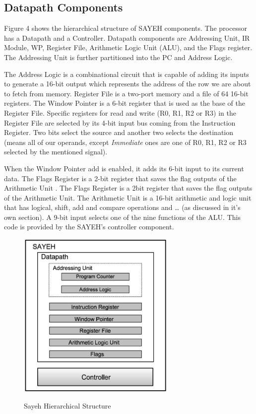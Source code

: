 \documentclass{report}
\begin{document}
    \subsection{Datapath Components}
        Figure 4 shows the hierarchical structure of SAYEH components. The processor has a Datapath and a Controller. Datapath components are Addressing Unit, IR Module, WP, Register File, Arithmetic Logic Unit (ALU), and the Flags register. The Addressing Unit is further partitioned into the PC and Address Logic.
    \par
        The Address Logic is a combinational circuit that is capable of adding its inputs to generate a 16-bit output which represents the address of the row we are about to fetch from memory. Register File is a two-port memory and a file of 64 16-bit registers. The Window Pointer is a 6-bit register that is used as the base of the Register File. Specific registers for read and write (R0, R1, R2 or R3) in the Register File are selected by its 4-bit input bus coming from the Instruction Register. Two bits select the source and another two selects the destination (means all of our operands, except \textit{Immediate} ones are one of R0, R1, R2 or R3 selected by the mentioned signal).
    \par
        When the Window Pointer add is enabled, it adds its 6-bit input to its current data. The Flags Register is a 2-bit register that saves the flag outputs of the Arithmetic Unit . The Flags Register is a 2bit register that saves the flag outputs of the Arithmetic Unit. The Arithmetic Unit is a 16-bit arithmetic and logic unit that has logical, shift, add and compare operations and … (as discussed in it's own section). A 9-bit input selects one of the nine functions of the ALU. This code is provided by the SAYEH’s controller component.
    \begin{figure}[ht]
        \centering
        \includegraphics[width=0.68\textwidth]{figs/fig4}\\
        \caption{Sayeh Hierarchical Structure}
    \end{figure}
    
\end{document}
